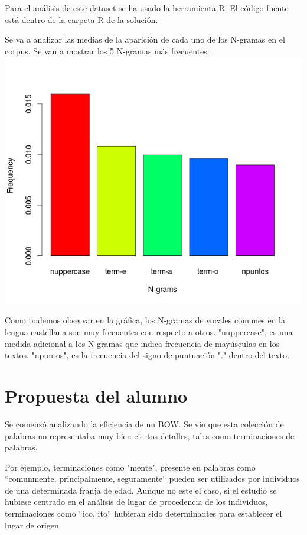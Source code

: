 \documentclass[11pt,a4paper]{article}
\begin{document}
Para el análisis de este dataset se ha usado la herramienta R. El código fuente está dentro de la carpeta R de la solución.

Se va a analizar las medias de la aparición de cada uno de los N-gramas en el corpus. Se van a mostrar los 5 N-gramas más frecuentes:
\includegraphics[scale=0.35]{barrasMeans}

Como podemos observar en la gráfica, los N-gramas de vocales comunes en la lengua castellana son muy frecuentes con respecto a otros. "nuppercase",  es una medida adicional a los N-gramas que indica frecuencia de mayúsculas en los textos. "npuntos", es la frecuencia del signo de puntuación "." dentro del texto.


\section{Propuesta del alumno}

Se comenzó analizando la eficiencia de un BOW. Se vio que esta colección de palabras no representaba muy bien ciertos detalles, tales como terminaciones de palabras. 

Por ejemplo, terminaciones como "mente", presente en palabras como ``comunmente, principalmente, seguramente`` pueden ser utilizados por individuos de una determinada franja de edad. Aunque no este el caso, si el estudio se hubiese centrado en el análisis de lugar de procedencia de los individuos, terminaciones como ``ico, ito`` hubieran sido determinantes para establecer el lugar de origen.
\end{document}
